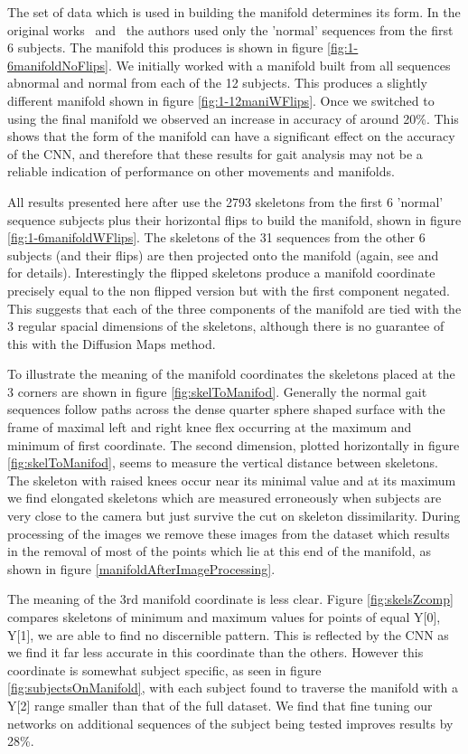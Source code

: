 \documentclass[11pt]{article} %
\begin{document}
The set of data which is used in building the manifold determines its form. In the original works~\cite{Paiement} and~\cite{Tao} the authors used only the 'normal' sequences from the first 6 subjects. The manifold this produces is shown in figure \ref{fig:1-6manifoldNoFlips}. We initially worked with a manifold built from all sequences abnormal and normal from each of the 12 subjects. This produces a slightly different manifold shown in figure \ref{fig:1-12maniWFlips}. Once we switched to using the final manifold we observed an increase in accuracy of around 20\%. This shows that the form of the manifold can have a significant effect on the accuracy of the CNN, and therefore that these results for gait analysis may not be a reliable indication of performance on other movements and manifolds.

All results presented here after use the 2793 skeletons from the first 6 'normal' sequence subjects plus their horizontal flips to build the manifold, shown in figure \ref{fig:1-6manifoldWFlips}. The skeletons of the 31 sequences from the other 6 subjects (and their flips) are then projected onto the manifold (again, see \cite{Paiement} and~\cite{Tao} for details). Interestingly the flipped skeletons produce a manifold coordinate precisely equal to the non flipped version but with the first component negated. This suggests that each of the three components of the manifold are tied with the 3 regular spacial dimensions of the skeletons, although there is no guarantee of this with the Diffusion Maps method. 

To illustrate the meaning of the manifold coordinates the skeletons placed at the 3 corners are shown in figure \ref{fig:skelToManifod}. Generally the normal gait sequences follow paths across the dense quarter sphere shaped surface with the frame of maximal left and right knee flex occurring at the maximum and minimum of first coordinate. The second dimension, plotted horizontally in figure \ref{fig:skelToManifod}, seems to measure the vertical distance between skeletons. The skeleton with raised knees occur near its minimal value and at its maximum we find elongated skeletons which are measured erroneously when subjects are very close to the camera but just survive the cut on skeleton dissimilarity. During processing of the images we remove these images from the dataset which results in the removal of most of the points which lie at this end of the manifold, as shown in figure \ref{manifoldAfterImageProcessing}. 

The meaning of the 3rd manifold coordinate is less clear. Figure \ref{fig:skelsZcomp} compares skeletons of minimum and maximum values for points of equal Y[0], Y[1], we are able to find no discernible pattern. This is reflected by the CNN as we find it far less accurate in this coordinate than the others. However this coordinate is somewhat subject specific, as seen in figure \ref{fig:subjectsOnManifold}, with each subject found to traverse the manifold with a Y[2] range smaller than that of the full dataset. We find that fine tuning our networks on additional sequences of the subject being tested improves results by 28\%. 
\end{document}
